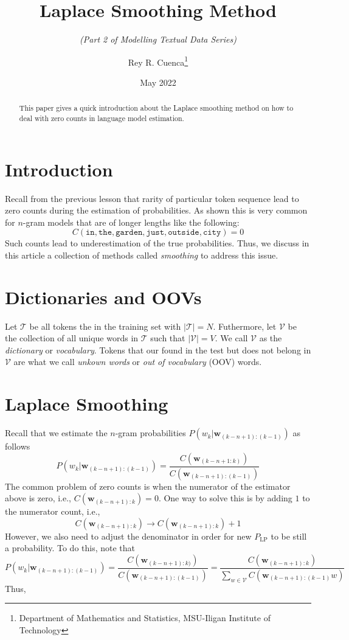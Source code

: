 \documentclass[
  12pt,
  a4paper]{article}
\title{Laplace Smoothing Method}
\subtitle{\emph{(Part 2 of Modelling Textual Data Series)}}
\author{Rey R. Cuenca\footnote{Department of Mathematics and Statistics, MSU-Iligan Institute of Technology}}
\date{May 2022}
\theoremstyle{definition}
\theoremstyle{definition}
\theoremstyle{definition}
\theoremstyle{definition}
\theoremstyle{remark}
\begin{document}
\maketitle
\begin{abstract}
This paper gives a quick introduction about the Laplace smoothing method on how to deal with zero counts in language model estimation.
\end{abstract}

\hypertarget{introduction}{%
\section{Introduction}\label{introduction}}

Recall from the previous lesson that rarity of particular token sequence lead to zero counts during the estimation of probabilities. As shown this is very common for \(n\)-gram models that are of longer lengths like the following:
\[
C(\texttt{in},\texttt{the},\texttt{garden},\texttt{just},\texttt{outside},\texttt{city}) = 0
\]
Such counts lead to underestimation of the true probabilities. Thus, we discuss in this article a collection of methods called \emph{smoothing} to address this issue.

\hypertarget{dictionaries-and-oovs}{%
\section{Dictionaries and OOVs}\label{dictionaries-and-oovs}}

Let \(\mathcal{T}\) be all tokens the in the training set with \(|\mathcal{T}| = N\). Futhermore, let \(\mathcal{V}\) be the collection of all unique words in \(\mathcal{T}\) such that \(|\mathcal{V}| = V\). We call \(\mathcal{V}\) as the \emph{dictionary} or \emph{vocabulary}. Tokens that our found in the test but does not belong in \(\mathcal{V}\) are what we call \emph{unkown words} or \emph{out of vocabulary} (OOV) words.

\hypertarget{laplace-smoothing}{%
\section{Laplace Smoothing}\label{laplace-smoothing}}

Recall that we estimate the \(n\)-gram probabilities \(P(w_k|\mathbf{w}_{(k-n+1):(k-1)})\) as follows
\begin{equation}
P(w_k|\mathbf{w}_{(k-n+1):(k-1)}) = \frac{C(\mathbf{w}_{(k-n+1:k)})}{C(\mathbf{w}_{(k-n+1):(k-1)})}
\label{eq:ngram-prob}
\end{equation}
The common problem of zero counts is when the numerator of the estimator above is zero, i.e., \(C(\mathbf{w}_{(k-n+1):k})=0\). One way to solve this is by adding \(1\) to the numerator count, i.e.,
\[
C(\mathbf{w}_{(k-n+1):k}) \longrightarrow C(\mathbf{w}_{(k-n+1):k}) + 1
\]
However, we also need to adjust the denominator in order for new \(P_{\text{LP}}\) to be still a probability. To do this, note that
\[
P(w_k|\mathbf{w}_{(k-n+1):(k-1)}) 
= \frac{C(\mathbf{w}_{(k-n+1):k)})}{C(\mathbf{w}_{(k-n+1):(k-1)})}
= \frac{C(\mathbf{w}_{(k-n+1):k})}{\sum_{w\in\mathcal{V}} C(\mathbf{w}_{(k-n+1):(k-1)}w)}
\]
Thus,
\end{document}
